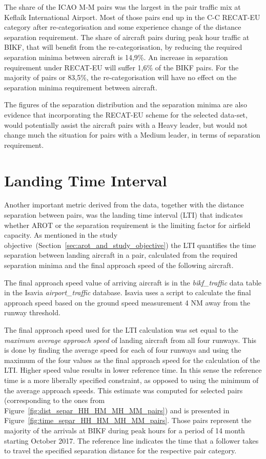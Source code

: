 The share of the ICAO M-M pairs was the largest in the pair traffic mix at Keflaík International Airport. Most of those pairs end up in the C-C RECAT-EU category after re-categorisation and some experience change of the distance separation requirement. The share of aircraft pairs during peak hour traffic at BIKF, that will benefit from the re-categorisation, by reducing the required separation minima between aircraft is 14,9\%. An increase in separation requirement under RECAT-EU will suffer 1,6\% of the BIKF pairs. For the majority of pairs or 83,5\%, the re-categorisation will have no effect on the separation minima requirement between aircraft. 

The figures of the separation distribution and the separation minima are also evidence that incorporating the RECAT-EU scheme for the selected data-set, would potentially assist the aircraft pairs with a Heavy leader, but would not change much the situation for pairs with a Medium leader, in terms of separation requirement.

\section{Landing Time Interval}\label{sec:LTI}

Another important metric derived from the data, together with the distance separation between pairs, was the landing time interval (LTI) that indicates whether AROT or the separation requirement is the limiting factor for airfield capacity. As mentioned in the study objective~(Section~\ref{sec:arot_and_study_objective}) the LTI quantifies the time separation between landing aircraft in a pair, calculated from the required separation minima and the final approach speed of the following aircraft. 

The final approach speed value of arriving aircraft is in the \textit{bikf\_traffic} data table in the Isavia \textit{airport\_traffic} database. Isavia uses a script to calculate the final approach speed based on the ground speed measurement 4 NM away from the runway threshold. 

The final approach speed used for the LTI calculation was set equal to the \textit{maximum average approach speed} of landing aircraft from all four runways. This is done by finding the average speed for each of four runways and using the maximum of the four values as the final approach speed for the calculation of the LTI. Higher speed value results in lower reference time. In this sense the reference time is a more liberally specified constraint, as opposed to using the minimum of the average approach speeds. This estimate was computed for selected pairs (corresponding to the ones from Figure~\ref{fig:dist_separ_HH_HM_MH_MM_pairs}) and is presented in Figure~\ref{fig:time_separ_HH_HM_MH_MM_pairs}. Those pairs represent the majority of the arrivals at BIKF during peak hours for a period of 14 month starting October 2017. The reference line indicates the time that a follower takes to travel the specified separation distance for the respective pair category.

